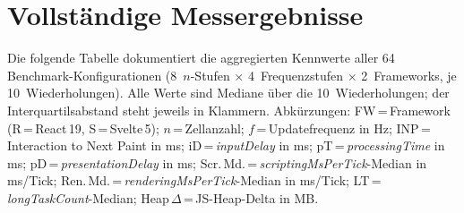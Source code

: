 \cleardoublepage
\chapter{Vollständige Messergebnisse}
\label{ch:a_benchmark}

Die folgende Tabelle dokumentiert die aggregierten Kennwerte aller 64 Benchmark-Konfigurationen
(8~$n$-Stufen $\times$ 4~Frequenzstufen $\times$ 2~Frameworks, je 10~Wiederholungen).
Alle Werte sind Mediane über die 10~Wiederholungen; der Interquartilsabstand steht jeweils in
Klammern.
Abkürzungen: FW\,=\,Framework (R\,=\,React\,19, S\,=\,Svelte\,5);
$n$\,=\,Zellanzahl; $f$\,=\,Updatefrequenz in Hz;
INP\,=\,Interaction to Next Paint in ms;
iD\,=\,\textit{inputDelay} in ms;
pT\,=\,\textit{processingTime} in ms;
pD\,=\,\textit{presentationDelay} in ms;
Scr.\,Md.\,=\,\textit{scriptingMsPerTick}-Median in ms/Tick;
Ren.\,Md.\,=\,\textit{renderingMsPerTick}-Median in ms/Tick;
LT\,=\,\textit{longTaskCount}-Median;
Heap\,$\Delta$\,=\,JS-Heap-Delta in MB.

